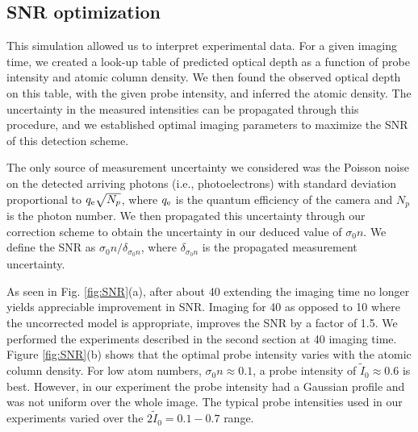 \documentclass[12pt]{iopart}
\begin{document}
\subsection{SNR optimization}
This simulation allowed us to interpret experimental data. For a given imaging time, we created a look-up table of predicted optical depth as a function of probe intensity and atomic column density. We then found the observed optical depth on this table, with the given probe intensity, and inferred the atomic density. The uncertainty in the measured intensities can be propagated through this procedure, and we established optimal imaging parameters to maximize the SNR of this detection scheme.
\par The only source of measurement uncertainty we considered was the Poisson noise on the detected arriving photons (i.e., photoelectrons) with standard deviation proportional to $q_{\rm{e}}\sqrt{N_p}$, where $q_{\rm{e}}$ is the quantum efficiency of the camera and $N_p$ is the photon number. We then propagated this uncertainty through our correction scheme to obtain the uncertainty in our deduced value of $\sigma_0 n$. We define the SNR as $\sigma_0 n/\delta_{\sigma_0 n}$, where $ \delta_{\sigma_0 n}$ is the propagated measurement uncertainty.
\par As seen in Fig. \ref{fig:SNR}(a), after about 40 \us{} extending the imaging time no longer yields appreciable improvement in SNR. Imaging for 40 \us{} as opposed to 10 \us{} where the uncorrected model is appropriate, improves the SNR by a factor of  1.5. We performed the experiments described in the second section at 40 \us{} imaging time. Figure \ref{fig:SNR}(b) shows that the optimal probe intensity varies with the atomic column density. For low atom numbers, $\sigma_0 n\approx0.1$, a probe intensity of $\tilde{I}_0\approx0.6$ is best. However, in our experiment the probe intensity had a Gaussian profile and was not uniform over the whole image.  The typical probe intensities used in our experiments varied over the $2\tilde{I}_0=0.1-0.7$  range.
\end{document}
